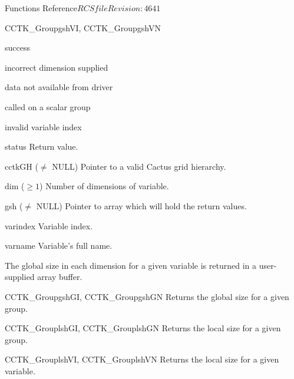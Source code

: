 \begin{cactuspart}{ Functions Reference}{$RCSfile$}{$Revision: 4641 $}
\begin{FunctionDescription}{CCTK\_GroupgshVI, CCTK\_GroupgshVN}
\begin{ResultSection}
\begin{Result}{0} success \end{Result}
\begin{Result}{-1} incorrect dimension supplied \end{Result}
\begin{Result}{-2} data not available from driver \end{Result}
\begin{Result}{-3} called on a scalar group \end{Result}
\begin{Result}{-4} invalid variable index \end{Result}
\end{ResultSection}

\begin{ParameterSection}
\begin{Parameter}{status} Return value. \end{Parameter}
\begin{Parameter}{cctkGH ($\ne$ NULL)} Pointer to a valid Cactus grid hierarchy. \end{Parameter}
\begin{Parameter}{dim ($\ge 1$)} Number of dimensions of variable. \end{Parameter}
\begin{Parameter}{gsh ($\ne$ NULL)} Pointer to array which will hold the return values. \end{Parameter}
\begin{Parameter}{varindex} Variable index. \end{Parameter}
\begin{Parameter}{varname} Variable's full name. \end{Parameter}
\end{ParameterSection}

\begin{Discussion}
The global size in each dimension for a given variable is returned in a user-supplied array buffer.
\end{Discussion}

\begin{SeeAlsoSection}
\begin{SeeAlso}{CCTK\_GroupgshGI, CCTK\_GroupgshGN}
Returns the global size for a given group.
\end{SeeAlso}
\begin{SeeAlso}{CCTK\_GrouplshGI, CCTK\_GrouplshGN}
Returns the local size for a given group.
\end{SeeAlso}
\begin{SeeAlso}{CCTK\_GrouplshVI, CCTK\_GrouplshVN}
Returns the local size for a given variable.
\end{SeeAlso}
\end{SeeAlsoSection}
\end{FunctionDescription}



\end{cactuspart}
